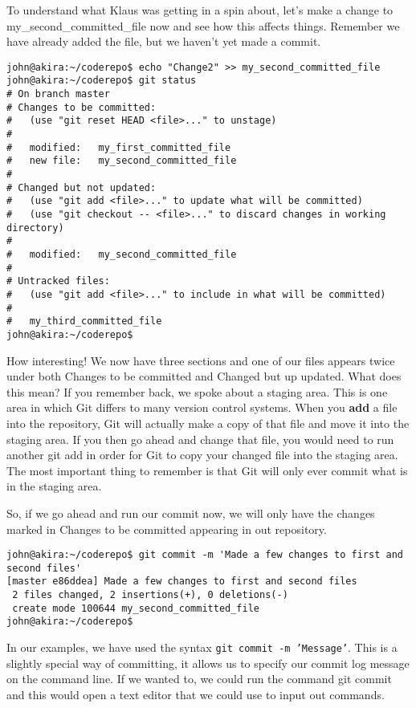 To understand what Klaus was getting in a spin about, let's make a change to my\_second\_committed\_file now and see how this affects things.  Remember we have already added the file, but we haven't yet made a commit.

\begin{Verbatim}[frame=single,fontsize=\relsize{-3}] 
john@akira:~/coderepo$ echo "Change2" >> my_second_committed_file 
john@akira:~/coderepo$ git status
# On branch master
# Changes to be committed:
#   (use "git reset HEAD <file>..." to unstage)
#
#	modified:   my_first_committed_file
#	new file:   my_second_committed_file
#
# Changed but not updated:
#   (use "git add <file>..." to update what will be committed)
#   (use "git checkout -- <file>..." to discard changes in working directory)
#
#	modified:   my_second_committed_file
#
# Untracked files:
#   (use "git add <file>..." to include in what will be committed)
#
#	my_third_committed_file
john@akira:~/coderepo$ 
\end{Verbatim} 

How interesting!  We now have three sections and one of our files appears twice under both Changes to be committed and Changed but up updated.  What does this mean?  If you remember back, we spoke about a staging area.  This is one area in which Git differs to many version control systems.  When you \textbf{add} a file into the repository, Git will actually make a copy of that file and move it into the staging area.  If you then go ahead and change that file, you would need to run another git add in order for Git to copy your changed file into the staging area.  The most important thing to remember is that Git will only ever commit what is in the staging area.

So, if we go ahead and run our commit now, we will only have the changes marked in Changes to be committed appearing in out repository.  

\begin{Verbatim}[frame=single,fontsize=\relsize{-3}] 
john@akira:~/coderepo$ git commit -m 'Made a few changes to first and second files'
[master e86ddea] Made a few changes to first and second files
 2 files changed, 2 insertions(+), 0 deletions(-)
 create mode 100644 my_second_committed_file
john@akira:~/coderepo$ 
\end{Verbatim} 

In our examples, we have used the syntax \texttt{git commit -m 'Message'}.  This is a slightly special way of committing, it allows us to specify our commit log message on the command line.  If we wanted to, we could run the command git commit and this would open a text editor that we could use to input out commands.

